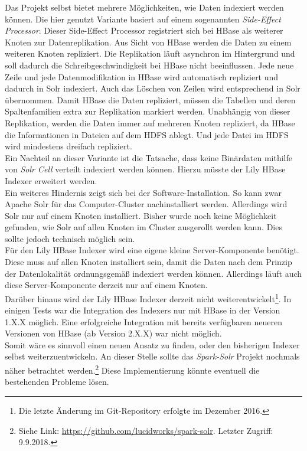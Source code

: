 \noindent
Das Projekt selbst bietet mehrere Möglichkeiten, wie Daten indexiert werden können. Die hier genutzt Variante basiert auf einem sogenannten \textit{Side-Effect Processor}.\cite{hbase_sep} 
Dieser Side-Effect Processor registriert sich bei HBase als weiterer Knoten zur Datenreplikation. Aus Sicht von HBase werden die Daten zu einem weiteren Knoten repliziert. Die Replikation läuft asynchron im Hintergrund und soll dadurch die Schreibgeschwindigkeit bei HBase nicht beeinflussen. Jede neue Zeile und jede Datenmodifikation in HBase wird automatisch repliziert und dadurch in Solr indexiert.
Auch das Löschen von Zeilen wird entsprechend in Solr übernommen. Damit HBase die Daten repliziert, müssen die Tabellen und deren Spaltenfamilien extra zur Replikation markiert werden. Unabhängig von dieser Replikation, werden die Daten immer auf mehreren Knoten repliziert, da HBase die Informationen in Dateien auf dem HDFS ablegt. Und jede Datei im HDFS wird mindestens dreifach repliziert.\\

\noindent
Ein Nachteil an dieser Variante ist die Tatsache, dass keine Binärdaten mithilfe von \textit{Solr Cell} verteilt indexiert werden können. Hierzu müsste der Lily HBase Indexer erweitert werden.\\
Ein weiteres Hindernis zeigt sich bei der Software-Installation. So kann zwar Apache Solr für das Computer-Cluster nachinstalliert werden. Allerdings wird Solr nur auf einem Knoten installiert. Bisher wurde noch keine Möglichkeit gefunden, wie Solr auf allen Knoten im Cluster ausgerollt werden kann. Dies sollte jedoch technisch möglich sein.\\
Für den Lily HBase Indexer wird eine eigene kleine Server-Komponente benötigt. Diese muss auf allen Knoten installiert sein, damit die Daten nach dem Prinzip der Datenlokalität ordnungsgemäß indexiert werden können. Allerdings läuft auch diese Server-Komponente derzeit nur auf einem Knoten.\\
Darüber hinaus wird der Lily HBase Indexer derzeit nicht weiterentwickelt\footnote{Die letzte Änderung im Git-Repository erfolgte im Dezember 2016.}. In einigen Tests war die Integration des Indexers nur mit HBase in der Version 1.X.X möglich. Eine erfolgreiche Integration mit bereits verfügbaren neueren Versionen von HBase  (ab Version 2.X.X) war nicht möglich.\\ 

\noindent
Somit wäre es sinnvoll einen neuen Ansatz zu finden, oder den bisherigen Indexer selbst weiterzuentwickeln. An dieser Stelle sollte das \textit{Spark-Solr} Projekt nochmals näher betrachtet werden.\footnote{Siehe Link: \url{https://github.com/lucidworks/spark-solr}. Letzter Zugriff: 9.9.2018.} Diese Implementierung könnte eventuell die bestehenden Probleme lösen. 



